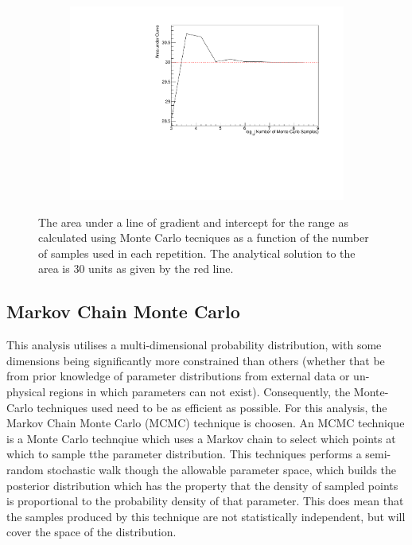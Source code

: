 \begin{figure}[h]
  \begin{subfigure}[t]{0.80\textwidth}
    \includegraphics[width=\textwidth, trim={0mm 0mm 0mm 0mm}, clip,page=1]{Figures/MCMC/MCTechnique_NThrowsStudy.pdf}
  \end{subfigure}
  \caption{The area under a line of gradient  and intercept  for the range  as calculated using Monte Carlo tecniques as a function of the number of samples used in each repetition. The analytical solution to the area is 30 units as given by the red line.}
  \label{fig:MCMC_MCTechniqueNThrowsStudy}
\end{figure}

\subsection{Markov Chain Monte Carlo}
\label{sec:MarkovChainMonteCarlo_MarkovChainMC}
This analysis utilises a multi-dimensional probability distribution, with some dimensions being significantly more constrained than others (whether that be from prior knowledge of parameter distributions from external data or un-physical regions in which parameters can not exist). Consequently, the Monte-Carlo techniques used need to be as efficient as possible. For this analysis, the Markov Chain Monte Carlo (MCMC) technique is choosen. An MCMC technique is a Monte Carlo technqiue which uses a Markov chain to select which points at which to sample tthe parameter distribution. This techniques performs a semi-random stochastic walk though the allowable parameter space, which builds the posterior distribution which has the property that the density of sampled points is proportional to the probability density of that parameter. This does mean that the samples produced by this technique are not statistically independent, but will cover the space of the distribution.

